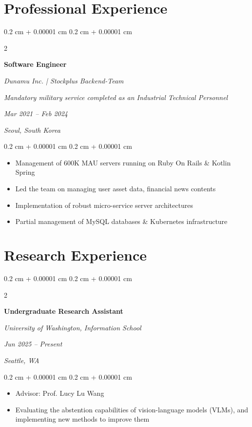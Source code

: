 \documentclass[10pt, letterpaper]{article}
\newenvironment{highlights}{
    \begin{itemize}[
        topsep=0.10 cm,
        parsep=0.10 cm,
        partopsep=0pt,
        itemsep=0pt,
        leftmargin=0.4 cm + 10pt
    ]
}{
    \end{itemize}
} %
\newenvironment{onecolentry}{
    \begin{adjustwidth}{
        0.2 cm + 0.00001 cm
    }{
        0.2 cm + 0.00001 cm
    }
}{
    \end{adjustwidth}
} %
\newenvironment{twocolentry}[2][]{
    \onecolentry
    \def\secondColumn{#2}
    \setcolumnwidth{\fill, 4.5 cm}
    \begin{paracol}{2}
}{
    \switchcolumn \raggedleft \secondColumn
    \end{paracol}
    \endonecolentry
} %
\begin{document}
    
    \section{Professional Experience}

        \begin{twocolentry}{
        \textit{Mar 2021 – Feb 2024}    
            
        \textit{Seoul, South Korea}}
            \textbf{Software Engineer}
            
            \textit{Dunamu Inc. | Stockplus Backend-Team}

            \textit{Mandatory military service completed as an Industrial Technical Personnel}
        \end{twocolentry}

        \vspace{0.10 cm}
        \begin{onecolentry}
            \begin{highlights}
                \item Management of 600K MAU servers running on Ruby On Rails \& Kotlin Spring
                \item Led the team on managing user asset data, financial news contents
                \item Implementation of robust micro-service server architectures
                \item Partial management of MySQL databases \& Kubernetes infrastructure
            \end{highlights}
        \end{onecolentry}


    \section{Research Experience}

        \begin{twocolentry}{
        \textit{Jun 2025 – Present}
        
        \textit{Seattle, WA}}
            \textbf{Undergraduate Research Assistant}

            \textit{University of Washington, Information School}
        \end{twocolentry}

        \vspace{0.10 cm}
        \begin{onecolentry}
            \begin{highlights}
                \item Advisor: Prof. Lucy Lu Wang
                \item Evaluating the abstention capabilities of vision-language models (VLMs), and implementing new methods to improve them
            \end{highlights}
        \end{onecolentry}
\end{document}
